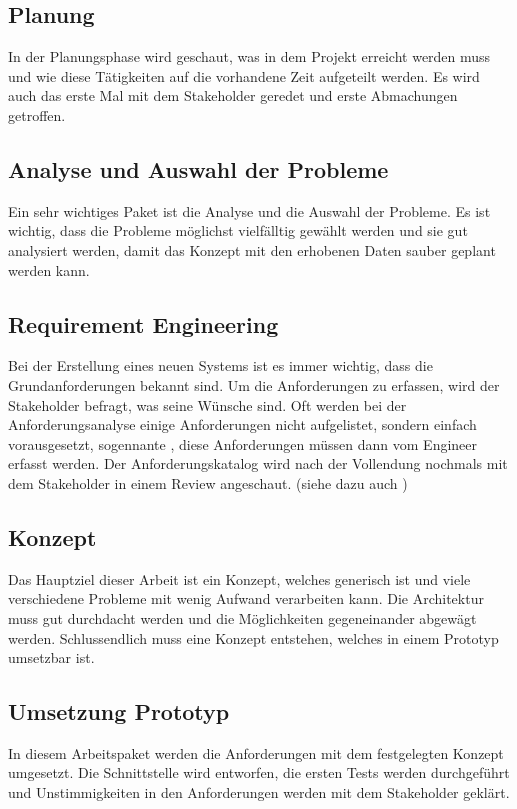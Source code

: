 \subsection{Planung}\label{planung}
In der Planungsphase wird geschaut, was in dem Projekt erreicht werden muss und wie diese Tätigkeiten auf die vorhandene Zeit aufgeteilt werden. Es wird auch das erste Mal mit dem 
Stakeholder geredet und erste Abmachungen getroffen.

\subsection{Analyse und Auswahl der Probleme}\label{analyse_auswahl_probleme}
Ein sehr wichtiges Paket ist die Analyse und die Auswahl der Probleme. Es ist wichtig, dass die Probleme möglichst vielfälltig gewählt werden und sie gut analysiert werden, damit das Konzept 
mit den erhobenen Daten sauber geplant werden kann.

\subsection{Requirement Engineering}\label{rqe}
Bei der Erstellung eines neuen Systems ist es immer wichtig, dass die Grundanforderungen bekannt sind. Um die Anforderungen zu erfassen, wird der Stakeholder befragt, was seine Wünsche 
sind. Oft werden bei der Anforderungsanalyse einige Anforderungen nicht aufgelistet, sondern einfach vorausgesetzt, sogennante , diese Anforderungen müssen dann vom 
Engineer erfasst werden. Der Anforderungskatalog wird nach der Vollendung nochmals mit dem Stakeholder in einem Review angeschaut. (siehe dazu auch \cite{req_eng_book})

\subsection{Konzept}\label{ref_backend}
Das Hauptziel dieser Arbeit ist ein Konzept, welches generisch ist und viele verschiedene Probleme mit wenig Aufwand verarbeiten kann. Die Architektur muss gut durchdacht werden und die 
Möglichkeiten gegeneinander abgewägt werden. Schlussendlich muss eine Konzept entstehen, welches in einem Prototyp umsetzbar ist.

\subsection{Umsetzung Prototyp}\label{eng_prototyp}
In diesem Arbeitspaket werden die Anforderungen mit dem festgelegten Konzept umgesetzt. Die Schnittstelle wird entworfen, die ersten Tests werden durchgeführt und Unstimmigkeiten in den 
Anforderungen werden mit dem Stakeholder geklärt.

